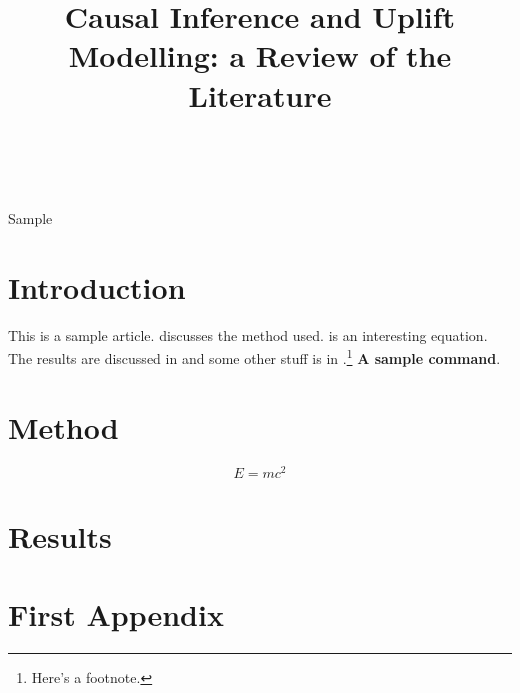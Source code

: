 \documentclass[wcp]{jmlr}
\title[Causal Inference and Uplift Modelling]{Causal Inference and Uplift Modelling: a Review of the Literature}
\author{\Name{Pierre Gutierrez}\Email{bdw@sample.com}\\
\Name{Jean-Yves G{\'e}rardy}\Email{emf@sample.com}}
\newcommand{\samplecommand}{\textbf{A sample command}}
\begin{document}
\maketitle

\begin{abstract}
\lipsum[1]
\end{abstract}
\begin{keywords}
Sample
\end{keywords}

\section{Introduction}

This is a sample article.  discusses
the method used.  is an interesting 
equation. The results are discussed in 
and some other stuff is in .\footnote{Here's
a footnote.}
\samplecommand.

\lipsum

\section{Method}\label{sec:method}

\lipsum

\begin{equation}\label{eq:emc2}
E = mc^2
\end{equation}

\section{Results}\label{sec:results}

\lipsum[1-55]

\appendix
\section{First Appendix}\label{apd:first}

\lipsum
\end{document}

